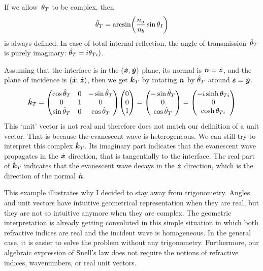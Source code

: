 If we allow~$\theta_T$ to be complex, then
\begin{equation}
    \cp{\theta}_\T = \arcsin
    \left(
        \frac{n_a}{n_b} \sin \theta_\I
    \right)
\end{equation}
is always defined.
In case of total internal reflection, the angle of transmission~$\hat{\theta}_T$ is purely imaginary: $\hat{\theta}_T = i \theta_{T i})$.

Assuming that the interface is in the $(\dot{\bm{x}}, \dot{\bm{y}})$ plane, its normal is $\dot{\bm{n}}=\dot{\bm{z}}$, and the plane of incidence is $(\dot{\bm{x}}, \dot{\bm{z}})$, then we get $\dot{\bm{k}}_T$ by rotating $\dot{\bm{n}}$ by $\hat{\theta}_T$ around $\dot{\bm{s}}=\dot{\bm{y}}$.
\begin{equation}
    \vectu{k}_\T =
    \begin{pmatrix}
        \cos \cp{\theta}_\T   & 0 & -\sin \cp{\theta}_\T \\
        0 & 1 & 0\\
        \sin \cp{\theta}_\T   & 0 & \cos \cp{\theta}_\T \\
    \end{pmatrix}
    \begin{pmatrix}
        0 \\ 0 \\ 1
    \end{pmatrix}
    =
    \begin{pmatrix}
        -\sin \cp{\theta}_\T \\ 0 \\ \cos \cp{\theta}_\T
    \end{pmatrix}
    =
    \begin{pmatrix}
        -i \sinh \theta_{\T \im} \\ 0 \\ \cosh \theta_{\T \im}
    \end{pmatrix}
\end{equation}
This `unit' vector is not real and therefore does not match our definition of a unit vector.
That is because the evanescent wave is heterogeneous.
We can still try to interpret this complex $\dot{\bm{k}}_T$.
Its imaginary part indicates that the evanescent wave propagates in the $\dot{\bm{x}}$ direction, that is tangentially to the interface.
The real part of $\dot{\bm{k}}_T$ indicates that the evanescent wave decays in the $\dot{\bm{z}}$ direction, which is the direction of the normal $\dot{\bm{n}}$.

This example illustrates why I decided to stay away from trigonometry.
Angles and unit vectors have intuitive geometrical representation when they are real, but they are not so intuitive anymore when they are complex.
The geometric interpretation is already getting convoluted in this simple situation in which both refractive indices are real and the incident wave is homogeneous.
In the general case, it is easier to solve the problem without any trigonometry.
Furthermore, our algebraic expression of Snell's law does not require the notions of refractive indices, wavenumbers, or real unit vectors.

